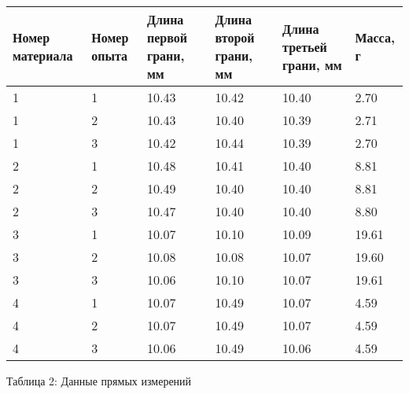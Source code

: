 \documentclass[12pt]{article}
\begin{document}
\begin{enumerate}
 \begin{center}
    \begin{tabular}{|m{5em}|m{5em}|m{5em}|m{5em}|m{5em}|m{5em}|}
        \hline
        Номер материала & Номер опыта  & Длина первой грани, мм & Длина второй грани, мм &  Длина третьей грани, мм & Масса, г \\ 
        
        \hline
        1 & 1 & 10.43 & 10.42 & 10.40 & 2.70 \\ \hline
        1 & 2 & 10.43 & 10.40 & 10.39 & 2.71\\ \hline
        1 & 3 & 10.42 & 10.44 & 10.39 & 2.70 \\ \hline 
        2 & 1 & 10.48 & 10.41 & 10.40 & 8.81 \\ \hline
        2 & 2 & 10.49 & 10.40 & 10.40 & 8.81 \\ \hline
        2 & 3 & 10.47 & 10.40 & 10.40 & 8.80 \\ \hline
        3 & 1 & 10.07 & 10.10 & 10.09 & 19.61 \\ \hline
        3 & 2 & 10.08 & 10.08 & 10.07 & 19.60 \\ \hline
        3 & 3 & 10.06 & 10.10 & 10.07 & 19.61 \\ \hline
        4 & 1 & 10.07 & 10.49 & 10.07 & 4.59 \\ \hline
        4 & 2 & 10.07 & 10.49 & 10.07 & 4.59 \\ \hline
        4 & 3 & 10.06 & 10.49 & 10.06 & 4.59 \\ \hline
    \end{tabular}
     \end{center}

    \begin{center}
        Таблица 2: Данные прямых измерений 
      \end{center}
\begin{center}
    

\end{center}
\end{enumerate}
\end{document}
